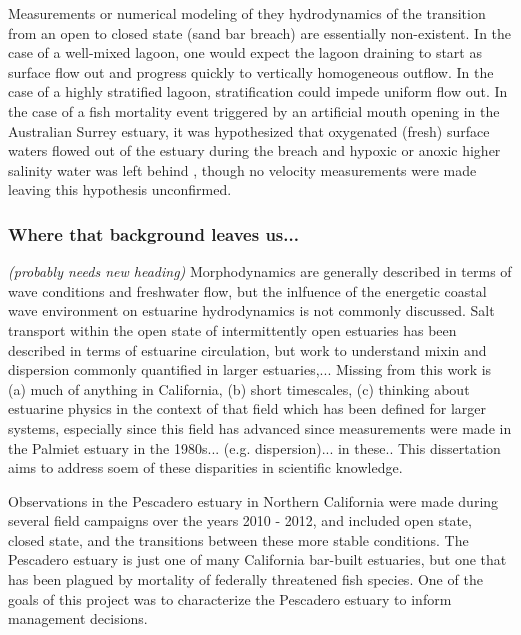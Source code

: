 Measurements or numerical modeling of they hydrodynamics of the transition from an open to closed state (sand bar breach) are essentially non-existent. In the case of a well-mixed lagoon, one would expect the lagoon draining to start as surface flow out and progress quickly to vertically homogeneous outflow.  In the case of a highly stratified lagoon, stratification could impede uniform flow out. In the case of a fish mortality event triggered by an artificial mouth opening in the Australian Surrey estuary, it was hypothesized that oxygenated (fresh) surface waters flowed out of the estuary during the breach and hypoxic or anoxic higher salinity water was left behind \parencite{becker_artificial_2009}, though no velocity measurements were made leaving this hypothesis unconfirmed.

\subsubsection{Where that background leaves us...} \emph{(probably needs new heading)}
Morphodynamics are generally described in terms of wave conditions and freshwater flow, but the inlfuence of the energetic coastal wave environment on estuarine hydrodynamics is not commonly discussed. Salt transport within the open state of intermittently open estuaries has been described in terms of estuarine circulation, but work to understand mixin and dispersion commonly quantified in larger estuaries,... 
Missing from this work is (a) much of anything in California, (b) short timescales, (c) thinking about estuarine physics in the context of that field which has been defined for larger systems, especially since this field has advanced since measurements were made in the Palmiet estuary in the 1980s... (e.g. dispersion)... in these.. This dissertation aims to address soem of these disparities in scientific knowledge.

Observations in the Pescadero estuary in Northern California were made during several field campaigns over the years 2010 - 2012, and included open state, closed state, and the transitions between these more stable conditions. The Pescadero estuary is just one of many California bar-built estuaries, but one that has been plagued by mortality of federally threatened fish species. One of the goals of this project was to characterize the Pescadero estuary to inform management decisions. 

